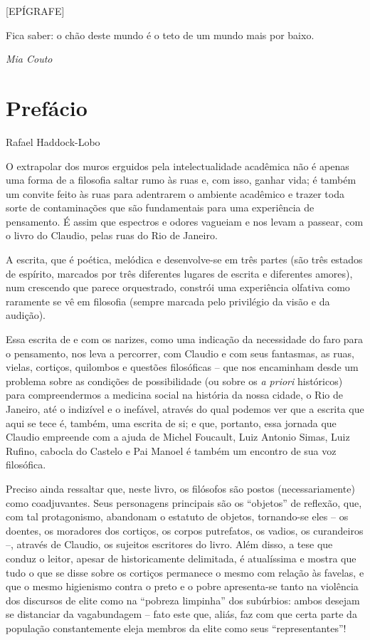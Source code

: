 {[}EPÍGRAFE{]}

Fica saber: o chão deste mundo é o teto de um mundo mais por baixo.

\emph{Mia Couto}

\hypertarget{prefuxe1cio}{%
\chapter{Prefácio}\label{prefuxe1cio}}

Rafael Haddock-Lobo

O extrapolar dos muros erguidos pela intelectualidade acadêmica não é
apenas uma forma de a filosofia saltar rumo às ruas e, com isso, ganhar
vida; é também um convite feito às ruas para adentrarem o ambiente
acadêmico e trazer toda sorte de contaminações que são fundamentais para
uma experiência de pensamento. É assim que espectros e odores vagueiam e
nos levam a passear, com o livro do Claudio, pelas ruas do Rio de
Janeiro.

A escrita, que é poética, melódica e desenvolve-se em três partes (são
três estados de espírito, marcados por três diferentes lugares de
escrita e diferentes amores), num crescendo que parece orquestrado,
constrói uma experiência olfativa como raramente se vê em filosofia
(sempre marcada pelo privilégio da visão e da audição).

Essa escrita de e com os narizes, como uma indicação da necessidade do
faro para o pensamento, nos leva a percorrer, com Claudio e com seus
fantasmas, as ruas, vielas, cortiços, quilombos e questões filosóficas
-- que nos encaminham desde um problema sobre as condições de
possibilidade (ou sobre os \emph{a priori} históricos) para
compreendermos a medicina social na história da nossa cidade, o Rio de
Janeiro, até o indizível e o inefável, através do qual podemos ver que a
escrita que aqui se tece é, também, uma escrita de si; e que, portanto,
essa jornada que Claudio empreende com a ajuda de Michel Foucault, Luiz
Antonio Simas, Luiz Rufino, cabocla do Castelo e Pai Manoel é também um
encontro de sua voz filosófica.

Preciso ainda ressaltar que, neste livro, os filósofos são postos
(necessariamente) como coadjuvantes. Seus personagens principais são os
``objetos'' de reflexão, que, com tal protagonismo, abandonam o estatuto
de objetos, tornando-se eles -- os doentes, os moradores dos cortiços,
os corpos putrefatos, os vadios, os curandeiros --, através de Claudio,
os sujeitos escritores do livro. Além disso, a tese que conduz o leitor,
apesar de historicamente delimitada, é atualíssima e mostra que tudo o
que se disse sobre os cortiços permanece o mesmo com relação às favelas,
e que o mesmo higienismo contra o preto e o pobre apresenta-se tanto na
violência dos discursos de elite como na ``pobreza limpinha'' dos
subúrbios: ambos desejam se distanciar da vagabundagem -- fato este que,
aliás, faz com que certa parte da população constantemente eleja membros
da elite como seus ``representantes''!

